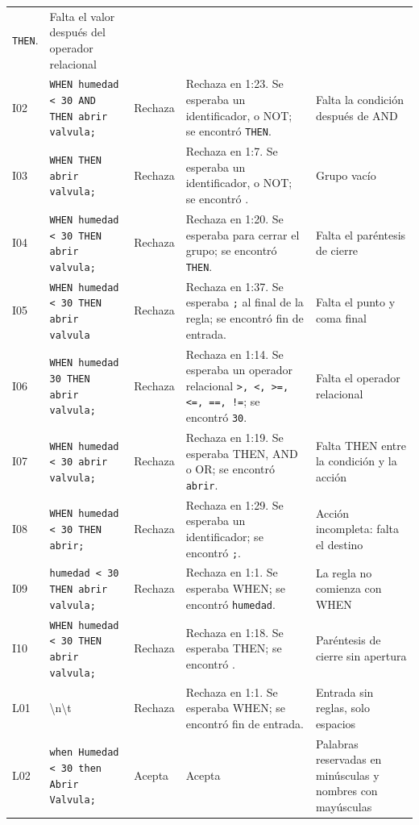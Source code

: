 \documentclass[11pt,a4paper]{article}
\begin{document}
\begin{xltabular}{\textwidth}{l Y{1.0} l Y{1.3} Y{0.7}}
  \texttt{THEN}. & Falta el valor después del operador relacional \\
  I02 & \texttt{WHEN humedad < 30 AND THEN abrir valvula;} & Rechaza
  & Rechaza en 1:23. Se esperaba un identificador, \texttt{} o NOT;
  se encontró \texttt{THEN}. & Falta la condición después de AND \\
  I03 & \texttt{WHEN  THEN abrir valvula;} &
  Rechaza & Rechaza en
  1:7. Se esperaba un identificador, \texttt{} o NOT; se encontró
  \texttt{}. & Grupo vacío \\
  I04 & \texttt{WHEN humedad < 30 THEN abrir valvula;} & Rechaza &
  Rechaza en 1:20. Se esperaba \texttt{} para cerrar el grupo; se
  encontró \texttt{THEN}. & Falta el paréntesis de cierre \\
  I05 & \texttt{WHEN humedad < 30 THEN abrir valvula} & Rechaza &
  Rechaza en 1:37. Se esperaba \texttt{;} al final de la regla; se
  encontró fin de entrada. & Falta el punto y coma final \\
  I06 & \texttt{WHEN humedad 30 THEN abrir valvula;} & Rechaza &
  Rechaza en 1:14. Se esperaba un operador relacional \texttt{>,
  <, >=, <=, ==, !=}; se encontró \texttt{30}. & Falta el operador
  relacional \\
  I07 & \texttt{WHEN humedad < 30 abrir valvula;} & Rechaza &
  Rechaza en 1:19. Se esperaba THEN, AND o OR; se encontró
  \texttt{abrir}. & Falta THEN entre la condición y la acción \\
  I08 & \texttt{WHEN humedad < 30 THEN abrir;} & Rechaza & Rechaza
  en 1:29. Se esperaba un identificador; se encontró \texttt{;}. &
  Acción incompleta: falta el destino \\
  I09 & \texttt{humedad < 30 THEN abrir valvula;} & Rechaza &
  Rechaza en 1:1. Se esperaba WHEN; se encontró \texttt{humedad}. &
  La regla no comienza con WHEN \\
  I10 & \texttt{WHEN humedad < 30 THEN abrir valvula;} & Rechaza &
  Rechaza en 1:18. Se esperaba THEN; se encontró \texttt{}. &
  Paréntesis de cierre sin apertura \\
  L01 & \textvisiblespace{}\textbackslash{}n\textbackslash{}t & Rechaza
  & Rechaza en 1:1. Se esperaba WHEN; se encontró fin de entrada. &
  Entrada sin reglas, solo espacios \\
  L02 & \texttt{when Humedad < 30 then Abrir Valvula;} & Acepta &
  Acepta & Palabras reservadas en minúsculas y nombres con mayúsculas \\

\end{xltabular}
\end{document}
